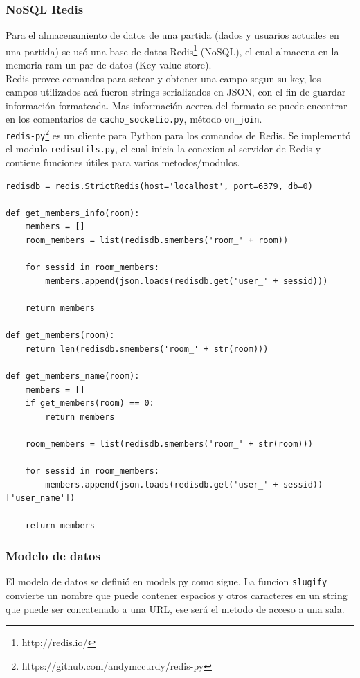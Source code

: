 \documentclass[a4paper,11pt]{article}
\begin{document}
\subsubsection{NoSQL Redis}
Para el almacenamiento de datos de una partida (dados y usuarios actuales en una partida) se usó una base de datos Redis\footnote{http://redis.io/} (NoSQL),
el cual almacena en la memoria ram un par de datos (Key-value store).\\

Redis provee comandos para setear y obtener una campo segun su key, los campos utilizados acá fueron strings serializados en JSON, con
el fin de guardar información formateada. Mas información acerca del formato se puede encontrar en los comentarios de
\texttt{cacho\_socketio.py}, método \texttt{on\_join}.\\

\texttt{redis-py}\footnote{https://github.com/andymccurdy/redis-py} es un cliente para Python para los comandos de Redis.
Se implementó el modulo \texttt{redisutils.py}, el cual inicia la conexion al servidor de Redis y contiene funciones útiles para
varios metodos/modulos.

\begin{lstlisting}[caption=cacho\_app/redisutils.py]
redisdb = redis.StrictRedis(host='localhost', port=6379, db=0)

def get_members_info(room):
	members = []
	room_members = list(redisdb.smembers('room_' + room))

	for sessid in room_members:
		members.append(json.loads(redisdb.get('user_' + sessid)))

	return members

def get_members(room):
	return len(redisdb.smembers('room_' + str(room)))

def get_members_name(room):
	members = []
	if get_members(room) == 0:
		return members
		
	room_members = list(redisdb.smembers('room_' + str(room)))
	
	for sessid in room_members:
		members.append(json.loads(redisdb.get('user_' + sessid))['user_name'])
	
	return members
\end{lstlisting}
\newpage
\subsubsection{Modelo de datos}
El modelo de datos se definió en models.py como sigue. La funcion \texttt{slugify} convierte un nombre
que puede contener espacios y otros caracteres en un string que puede ser concatenado a una URL, ese será
el metodo de acceso a una sala.\\
\end{document}
